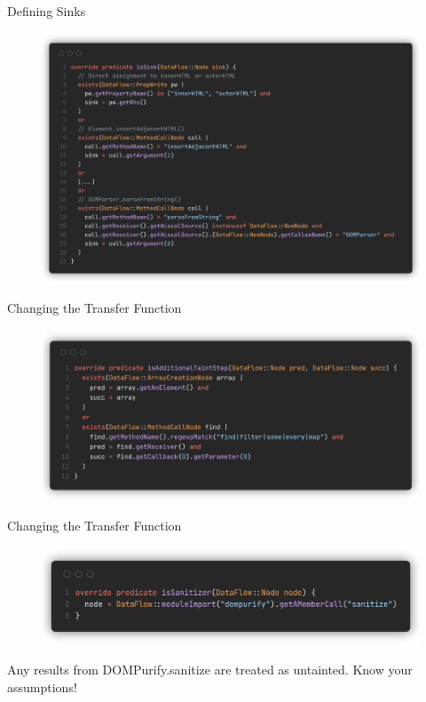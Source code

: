 \documentclass[aspectratio=169,xcolor=dvipsnames]{beamer}
\begin{document}
\begin{frame}{Defining Sinks}

	\begin{figure}
		\includegraphics[height=0.8\textheight]{img/5.png}
	\end{figure}
\end{frame}

\begin{frame}{Changing the Transfer Function}

	\begin{figure}
		\includegraphics[width=\textwidth]{img/6.png}
	\end{figure}
\end{frame}

\begin{frame}{Changing the Transfer Function}

	\begin{figure}
		\includegraphics[width=\textwidth]{img/7.png}
	\end{figure}

	Any results from DOMPurify.sanitize are treated as untainted. Know your
	assumptions!
\end{frame}
\end{document}
